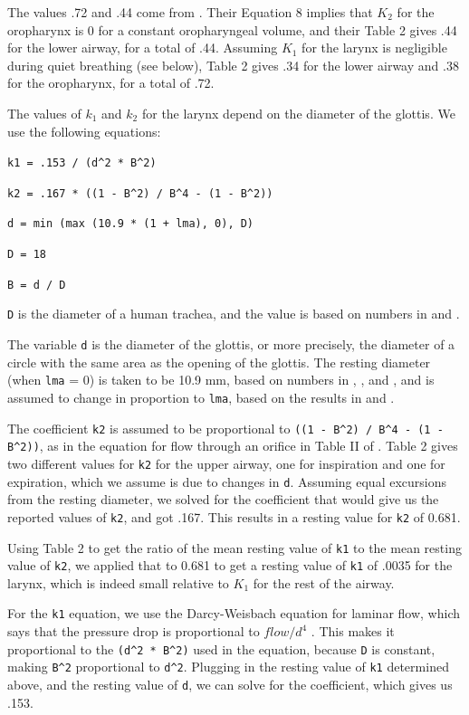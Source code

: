 \documentclass[12pt,openany,oneside]{book}
\newcommand{\ticode}[1]{\texttt{#1}}
\begin{document}
The values .72 and .44 come from
\citet{Renotte1998}. Their Equation 8 implies
that $K_2$ for the oropharynx is 0 for a constant oropharyngeal
volume, and their Table 2 gives .44 for the lower airway, for a total
of .44. Assuming $K_1$ for the larynx is negligible during quiet
breathing (see below), Table 2 gives .34 for the lower airway and .38
for the oropharynx, for a total of .72.

The values of $k_1$ and $k_2$ for the larynx depend on the diameter of
the glottis. We use the following equations:

\verb~k1 = .153 / (d^2 * B^2)~

\verb~k2 = .167 * ((1 - B^2) / B^4 - (1 - B^2))~

\ticode{d = min (max (10.9 * (1 + lma), 0), D)}

\ticode{D = 18}

\ticode{B = d / D}


\verb~D~ is the diameter of a human trachea, and the value is based on
numbers in \citet{Breatnach01051984} and \citet{CA:CA20815}.

The variable \verb~d~ is the diameter of the glottis, or more precisely,
the diameter of a circle with the same area as the opening of the
glottis. The resting diameter (when \verb~lma~ = 0) is taken to be
10.9 mm, based on numbers in \citet{D'Urzo01011988},
\citet{Brancatisano01051983}, and \citet{Baier1977}, and is assumed to
change in proportion to \verb~lma~, based on the results in
\citet{Tully01051990} and \cite{Tully01051991}.

The coefficient \verb~k2~ is assumed to be proportional to
\verb~((1 - B^2) / B^4 - (1 - B^2))~, as in the equation for flow
through an orifice in Table II of \citet{Simpson1968}.
\citet{Renotte1998} Table 2 gives two different values for \verb~k2~
for the upper airway, one for inspiration and one for expiration,
which we assume is due to changes in \verb~d~. Assuming equal
excursions from the resting diameter, we solved for the coefficient
that would give us the reported values of \verb~k2~, and got .167.
This results in a resting value for \verb~k2~ of 0.681.

Using \citet{Tully01051990} Table 2 to get the ratio of the mean
resting value of \verb~k1~ to the mean resting value of \verb~k2~, we
applied that to 0.681 to get a resting value of \verb~k1~ of .0035 for
the larynx, which is indeed small relative to $K_1$ for the rest of
the airway.

For the \verb~k1~ equation, we use the Darcy-Weisbach equation for
laminar flow, which says that the pressure drop is proportional to
$flow/d^4$ \citep{Kreith2004}. This makes it proportional to the
\verb~(d^2 * B^2)~ used in the equation, because \verb~D~ is constant,
making \verb~B^2~ proportional to \verb~d^2~. Plugging in the resting
value of \verb~k1~ determined above, and the resting value of
\verb~d~, we can solve for the coefficient, which gives us .153.
\end{document}
